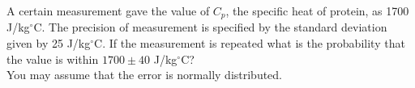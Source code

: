 \documentclass[a4paper,11pt]{book}
\begin{document}
\begin{question}

A certain measurement gave the value of $C_p$, the specific heat of protein, as 1700 J/kg$^{\circ}$C. The precision of measurement is specified by the standard deviation given by 25 J/kg$^{\circ}$C.
If the measurement is repeated what is the probability that the value is within $1700 \pm 40$ J/kg$^{\circ}$C? \\
You may assume that the error is normally distributed.
\examspace*{10em}

\end{question}
\begin{solution}

\end{solution}




\end{document}
